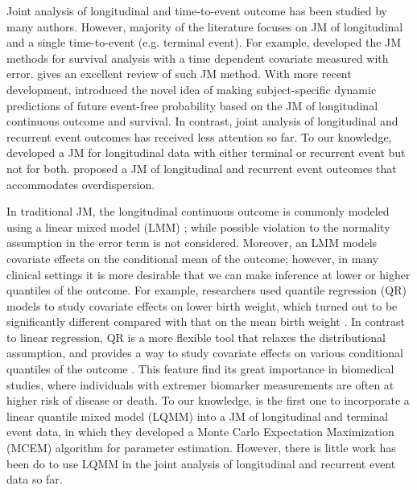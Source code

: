 Joint analysis of longitudinal and time-to-event outcome has been studied by many authors. However, majority of the literature focuses on JM of longitudinal and a single time-to-event (e.g. terminal event). For example, \cite{self1992modeling, tsiatis1995modeling, wulfsohn1997joint} developed the JM methods for survival analysis with a time dependent covariate measured with error. \cite{tsiatis2004joint} gives an excellent review of such JM method. With more recent development, \cite{rizopoulos2011dynamic,taylor2013real} introduced the novel idea of making subject-specific dynamic predictions of future event-free probability based on the JM of longitudinal continuous outcome and survival. In contrast, joint analysis of longitudinal and recurrent event outcomes has received less attention so far. To our knowledge, \cite{henderson2000joint} developed a JM for longitudinal data with either terminal or recurrent event but not for both. \cite{efendi2013joint} proposed a JM of longitudinal and recurrent event outcomes that accommodates overdispersion. 

In traditional JM, the longitudinal continuous outcome is commonly modeled using a linear mixed model (LMM) \citep{laird1982random}; while possible violation to the normality assumption in the error term is not considered. Moreover, an LMM  models covariate effects on the conditional mean of the outcome; however, in many clinical settings it is more desirable that we can make inference at lower or higher quantiles of the outcome. For example, researchers used quantile regression (QR) models to study covariate effects on lower birth weight, which turned out to be significantly different compared with that on the mean birth weight \citep{koenker2001quantile}. In contrast to linear regression, QR is a more flexible tool that relaxes the distributional assumption, and provides a way to study covariate effects on various conditional quantiles of the outcome \citep{koenker2005quantile}. This feature find its great importance in biomedical studies, where individuals with extremer biomarker measurements are often at higher risk of disease or death. To our knowledge, \cite{farcomeni2015longitudinal} is the first one to incorporate a linear quantile mixed model (LQMM) into a JM of longitudinal and terminal event data, in which they developed a Monte Carlo Expectation Maximization (MCEM) algorithm for parameter estimation. However, there is little work has been do to use LQMM in the joint analysis of longitudinal and recurrent event data so far.

